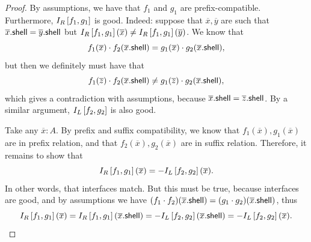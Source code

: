 \begin{proof}
    By assumptions, we have that $f_1$ and $g_1$ are prefix-compatible. Furthermore, $I_R \left[ f_1, g_1 \right]$ is good. Indeed: suppose that $\overline x, \overline y$ are such that $\overline x . \mathsf{shell} = \overline y . \mathsf{shell}$ but $I_R \left[ f_1, g_1 \right](\overline x) \neq I_R \left[ f_1, g_1 \right](\overline y)$. We know that
    \[
        f_1(\overline x) \cdot f_2(\overline x . \mathsf{shell}) = g_1(\overline x) \cdot g_2(\overline x . \mathsf{shell}),
    \]
    but then we definitely must have that
    \[
        f_1(\overline z) \cdot f_2(\overline x . \mathsf{shell}) \neq g_1(\overline z) \cdot g_2(\overline x . \mathsf{shell}),
    \]
    which gives a contradiction with assumptions, because $\overline x . \mathsf{shell} = \overline z . \mathsf{shell}$. By a similar argument, $I_L \left[ f_2, g_2 \right]$ is also good.

    Take any $\overline x : A$. By prefix and suffix compatibility, we know that $f_1(\overline x), g_1(\overline x)$ are in prefix relation, and that $f_2(\overline x), g_2(\overline x)$ are in suffix relation. Therefore, it remains to show that
    \[
        I_R \left[ f_1, g_1 \right](\overline x) = - I_L \left[ f_2, g_2 \right](\overline x).
    \]
    In other words, that interfaces match. But this must be true, because interfaces are good, and by assumptions we have $(f_1 \cdot f_2)(\overline x . \mathsf{shell}) = (g_1 \cdot g_2)(\overline x . \mathsf{shell})$, thus
    \[
        I_R \left[ f_1, g_1 \right](\overline x) = I_R \left[ f_1, g_1 \right](\overline x . \mathsf{shell}) = - I_L \left[ f_2, g_2 \right](\overline x . \mathsf{shell}) = - I_L \left[ f_2, g_2 \right](\overline x). \qedhere
    \]
\end{proof}
